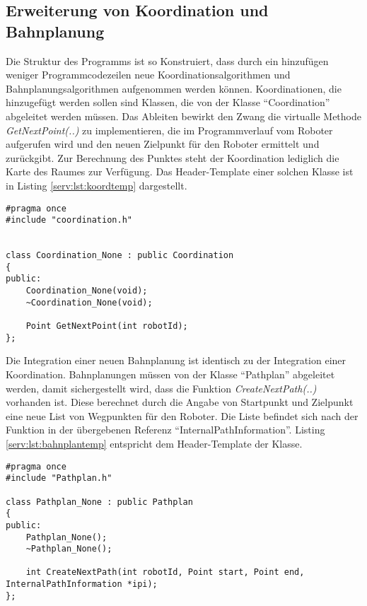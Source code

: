 \subsection{Erweiterung von Koordination und Bahnplanung}

Die Struktur des Programms ist so Konstruiert, dass durch ein hinzufügen weniger Programmcodezeilen neue Koordinationsalgorithmen und Bahnplanungsalgorithmen aufgenommen werden können. Koordinationen, die hinzugefügt werden sollen sind Klassen, die von der Klasse "`Coordination"' abgeleitet werden müssen. Das Ableiten bewirkt den Zwang die virtualle Methode {\it GetNextPoint(..)} zu implementieren, die im Programmverlauf vom Roboter aufgerufen wird und den neuen Zielpunkt für den Roboter ermittelt und zurückgibt. Zur Berechnung des Punktes steht der Koordination lediglich die Karte des Raumes zur Verfügung. Das Header-Template einer solchen Klasse ist in Listing \ref{serv:lst:koordtemp} dargestellt.

\begin{lstlisting}[frame=tb,captionpos=b,caption=Koordinationstemplate., label=serv:lst:koordtemp]
#pragma once
#include "coordination.h"


class Coordination_None : public Coordination
{
public:
    Coordination_None(void);
    ~Coordination_None(void);

    Point GetNextPoint(int robotId);
};
\end{lstlisting}

Die Integration einer neuen Bahnplanung ist identisch zu der Integration einer Koordination. Bahnplanungen müssen von der Klasse "`Pathplan"' abgeleitet werden, damit sichergestellt wird, dass die Funktion {\it CreateNextPath(..)} vorhanden ist. Diese berechnet durch die Angabe von Startpunkt und Zielpunkt eine neue List von Wegpunkten für den Roboter. Die Liste befindet sich nach der Funktion in der übergebenen Referenz "`InternalPathInformation"'. Listing \ref{serv:lst:bahnplantemp} entspricht dem Header-Template der Klasse.

\begin{lstlisting}[frame=tb,captionpos=b,caption=Bahnplantemplate., label=serv:lst:bahnplantemp]
#pragma once
#include "Pathplan.h"

class Pathplan_None : public Pathplan
{
public:
    Pathplan_None();
    ~Pathplan_None();

    int CreateNextPath(int robotId, Point start, Point end, InternalPathInformation *ipi);
};
\end{lstlisting}

